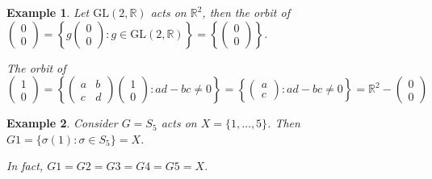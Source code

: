 \documentclass{article}
\theoremstyle{MyNonumberplain}
\theoremstyle{break}
\newcommand{\tmop}{\text}
\theoremstyle{break}
\newtheorem{example}{Example}[section]
\theoremstyle{break}
\theoremstyle{definition}
\theoremstyle{break}
\begin{document}
  \begin{expbox}
    \begin{example}
        Let $\tmop{GL} (2, \mathbb{R})$ acts on $\mathbb{R}^2$, then the orbit of
        $\left(\begin{array}{c}
        0\\
        0
        \end{array}\right) = \left\{ g \left(\begin{array}{c}
        0\\
        0
        \end{array}\right) : g \in \tmop{GL} (2, \mathbb{R}) \right\} = \left\{
        \left(\begin{array}{c}
        0\\
        0
        \end{array}\right) \right\}$.\bigskip

        The orbit of $\left(\begin{array}{c}
        1\\
        0
        \end{array}\right) = \left\{ \left(\begin{array}{cc}
        a & b\\
        c & d
        \end{array}\right) \left(\begin{array}{c}
        1\\
        0
        \end{array}\right) : a d - b c \neq 0 \right\} = \left\{
        \left(\begin{array}{c}
        a\\
        c
        \end{array}\right) : a d - b c \neq 0 \right\} =\mathbb{R}^2 -
        \left(\begin{array}{c}
        0\\
        0
        \end{array}\right)$
    \end{example}
\end{expbox}

\begin{expbox}
    \begin{example}
        Consider $G = S_5$ acts on $X = \{ 1, \ldots, 5 \}$. Then $G 1 = \{ \sigma (1)
: \sigma \in S_5 \} = X$.

In fact, $G 1 = G 2 = G 3 = G 4 = G 5 = X$.
    \end{example}
\end{expbox}
\end{document}
